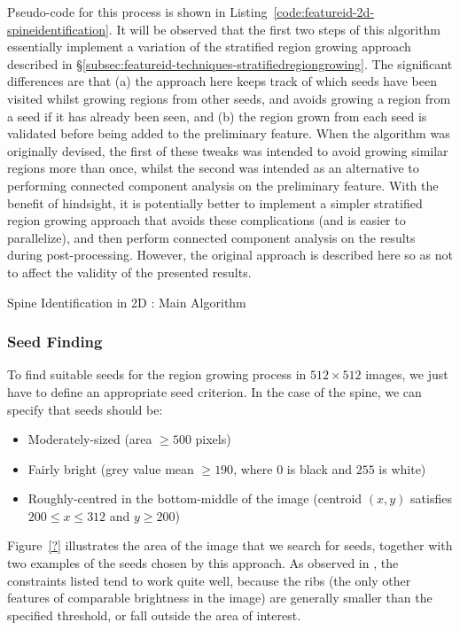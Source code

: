 \noindent Pseudo-code for this process is shown in Listing~\ref{code:featureid-2d-spineidentification}. It will be observed that the first two steps of this algorithm essentially implement a variation of the stratified region growing approach described in \S\ref{subsec:featureid-techniques-stratifiedregiongrowing}. The significant differences are that (a) the approach here keeps track of which seeds have been visited whilst growing regions from other seeds, and avoids growing a region from a seed if it has already been seen, and (b) the region grown from each seed is validated before being added to the preliminary feature. When the algorithm was originally devised, the first of these tweaks was intended to avoid growing similar regions more than once, whilst the second was intended as an alternative to performing connected component analysis on the preliminary feature. With the benefit of hindsight, it is potentially better to implement a simpler stratified region growing approach that avoids these complications (and is easier to parallelize), and then perform connected component analysis on the results during post-processing. However, the original approach is described here so as not to affect the validity of the presented results.

\begin{stulisting}[p]
\caption{Spine Identification in 2D : Main Algorithm}
\label{code:featureid-2d-spineidentification}

\end{stulisting}

\subsubsection{Seed Finding}

To find suitable seeds for the region growing process in $512 \times 512$ images, we just have to define an appropriate seed criterion. In the case of the spine, we can specify that seeds should be:
%
\begin{itemize}

\item Moderately-sized (area $\ge 500$ pixels)
\item Fairly bright (grey value mean $\ge 190$, where $0$ is black and $255$ is white)
\item Roughly-centred in the bottom-middle of the image (centroid $(x,y)$ satisfies $200 \le x \le 312$ and $y \ge 200$)

\end{itemize}
%
Figure~\ref{?} illustrates the area of the image that we search for seeds, together with two examples of the seeds chosen by this approach. As observed in \cite{gvcispa09}, the constraints listed tend to work quite well, because the ribs (the only other features of comparable brightness in the image) are generally smaller than the specified threshold, or fall outside the area of interest.

